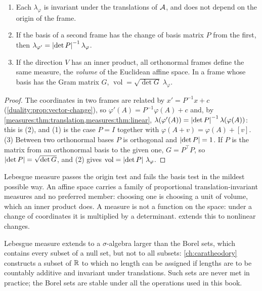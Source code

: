 \begin{notechapter}
\begin{proposition}\label{measures:prop:affine}
\begin{enumerate}[nosep]
  \item Each $\lambda_\varphi$ is invariant under the translations of
        $\mathcal{A}$, and does not depend on the origin of the frame.
  \item If the basis of a second frame has the change of basis matrix
        $P$ from the first, then
        $\lambda_{\varphi'} = \left|\det P\right|^{-1}\lambda_\varphi$.
  \item If the direction $V$ has an inner product, all orthonormal
        frames define the same measure, the \emph{volume} of the
        Euclidean affine space. In a frame whose basis has the Gram
        matrix $G$,
        $\operatorname{vol} = \sqrt{\det G}\;\lambda_\varphi$.
\end{enumerate}
\end{proposition}

\begin{proof}
The coordinates in two frames are related by $x' = P^{-1}x + c$
(\cref{duality:prop:vector-change}), so
$\varphi'(A) = P^{-1}\varphi(A) + c$ and, by
\cref{measures:thm:translation,measures:thm:linear},
$\lambda(\varphi'(A)) = \left|\det P\right|^{-1}\lambda(\varphi(A))$: this is
(2), and (1) is the case $P = I$ together with
$\varphi(A + v) = \varphi(A) + [v]$. (3) Between two orthonormal bases
$P$ is orthogonal and $\left|\det P\right| = 1$. If $P$ is the matrix from an
orthonormal basis to the given one, $G = P^\top P$, so
$\left|\det P\right| = \sqrt{\det G}$, and (2) gives
$\operatorname{vol} = \left|\det P\right|\,\lambda_\varphi$.
\end{proof}

\begin{keyidea}
Lebesgue measure passes the origin test and fails the basis test in the
mildest possible way. An affine space carries a family of proportional
translation-invariant measures and no preferred member: choosing one is
choosing a unit of volume, which an inner product does. A measure is not
a function on the space: under a change of coordinates it is multiplied
by a determinant.  extends this to
nonlinear changes.
\end{keyidea}

\begin{remark}
Lebesgue measure extends to a $\sigma$-algebra larger than the Borel
sets, which contains every subset of a null set, but not to all
subsets: \cref{ch:caratheodory} constructs a subset of $\mathbb{R}$ to which no
length can be assigned if lengths are to be countably additive and
invariant under translations. Such sets are never met in practice; the
Borel sets are stable under all the operations used in this book.
\end{remark}


\end{notechapter}
